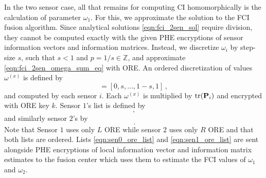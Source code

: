 \documentclass[letterpaper, 10 pt, conference]{ieeeconf}  %
\begin{document}
In the two sensor case, all that remains for computing CI homomorphically is the calculation of parameter $\omega_1$. For this, we approximate the solution to the FCI fusion algorithm. Since analytical solutions \eqref{eqn:fci_2sen_sol} require division, they cannot be computed exactly with the given PHE encryptions of sensor information vectors and information matrices. Instead, we discretize $\omega_i$ by step-size $s$, such that $s<1$ and $p=1/s \in \mathbb{Z}$, and approximate \eqref{eqn:fci_2sen_omega_sum_eq} with ORE. An ordered discretization of values $\omega^{(x)}$ is defined by
\begin{equation}
   [\omega^{(1)},\dots,\omega^{(p)}] = [0,s,\dots,1-s,1]\,,
\end{equation}
and computed by each sensor $i$. Each $\omega^{(x)}$ is multiplied by $\operatorname{tr}({{\mathbf{P}}}_i)$ and encrypted with ORE key $k$. Sensor $1$'s list is defined by 
\begin{equation}
   [\mathcal{E}^L_{ORE}(\omega^{(1)}\tr(\mP_1)),\dots,\mathcal{E}^L_{ORE}(\omega^{(p)}\tr(\mP_1))]\,, \label{eqn:sen0_ore_list}
\end{equation}
and similarly sensor $2$'s by
\begin{equation}
   [\mathcal{E}^R_{ORE}(\omega^{(1)}\tr(\mP_2)),\dots,\mathcal{E}^R_{ORE}(\omega^{(p)}\tr(\mP_2))]\,. \label{eqn:sen1_ore_list}
\end{equation}
Note that Sensor $1$ uses only $L$ ORE while sensor $2$ uses only $R$ ORE and that both lists are ordered. Lists \eqref{eqn:sen0_ore_list} and \eqref{eqn:sen1_ore_list} are sent alongside PHE encryptions of local information vector and information matrix estimates to the fusion center which uses them to estimate the FCI values of $\omega_1$ and $\omega_2$.
\end{document}
